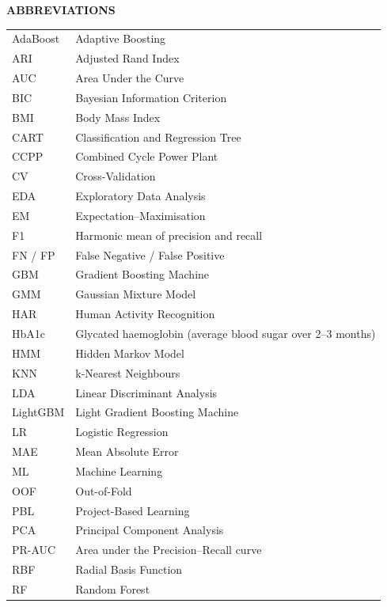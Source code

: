 \newpage
{}
{}
\begin{center}{\bfseries\fontsize{16}{20}\selectfont ABBREVIATIONS}\end{center}
\vspace{6pt}
\begin{singlespace}
\renewcommand{\arraystretch}{1.25}
\begin{tabular}{@{}p{3.2cm}p{11cm}@{}}
AdaBoost & Adaptive Boosting \\
ARI & Adjusted Rand Index \\
AUC & Area Under the Curve \\
BIC & Bayesian Information Criterion \\
BMI & Body Mass Index \\
CART & Classification and Regression Tree \\
CCPP & Combined Cycle Power Plant \\
CV & Cross-Validation \\
EDA & Exploratory Data Analysis \\
EM & Expectation–Maximisation \\
F1 & Harmonic mean of precision and recall \\
FN / FP & False Negative / False Positive \\
GBM & Gradient Boosting Machine \\
GMM & Gaussian Mixture Model \\
HAR & Human Activity Recognition \\
HbA1c & Glycated haemoglobin (average blood sugar over 2–3 months) \\
HMM & Hidden Markov Model \\
KNN & k-Nearest Neighbours \\
LDA & Linear Discriminant Analysis \\
LightGBM & Light Gradient Boosting Machine \\
LR & Logistic Regression \\
MAE & Mean Absolute Error \\
ML & Machine Learning \\
OOF & Out-of-Fold \\
PBL & Project-Based Learning \\
PCA & Principal Component Analysis \\
PR-AUC & Area under the Precision–Recall curve \\
RBF & Radial Basis Function \\
RF & Random Forest \\

\end{tabular}
\end{singlespace}
